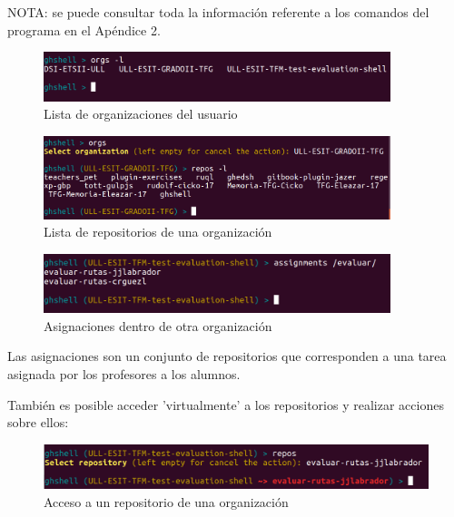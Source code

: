     NOTA: se puede consultar toda la información referente a los comandos del programa en el Apéndice 2.
        
        \begin{figure}[H]
		\begin{center}
		\includegraphics[width=0.9\textwidth]{images/ghshell3}
		\caption{Lista de organizaciones del usuario}
		\label{fig:ghshell3}
		\end{center}
		\end{figure}
		
		\begin{figure}[H]
		\begin{center}
		\includegraphics[width=0.9\textwidth]{images/ghshell4}
		\caption{Lista de repositorios de una organización}
		\label{fig:ghshell4}
		\end{center}
		\end{figure}
		
		\begin{figure}[H]
		\begin{center}
		\includegraphics[width=0.9\textwidth]{images/ghshell5}
		\caption{Asignaciones dentro de otra organización}
		\label{fig:ghshell5}
		\end{center}
		\end{figure}
    Las asignaciones son un conjunto de repositorios que corresponden a una tarea asignada por los profesores a los alumnos.
		
	También es posible acceder 'virtualmente' a los repositorios y realizar acciones sobre ellos:
	
		\begin{figure}[H]
		\begin{center}
		\includegraphics[width=1\textwidth]{images/ghshell5-1}
		\caption{Acceso a un repositorio de una organización}
		\label{fig:ghshell5-1}
		\end{center}
		\end{figure}

